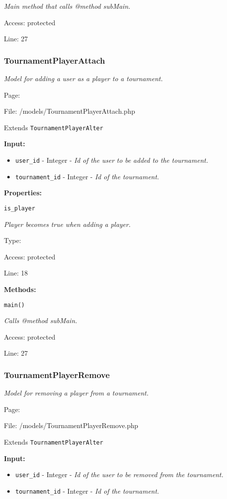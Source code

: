 {\scriptsize
\textit{Main method that calls @method subMain.}

Access: protected

Line: 27

}

\subsubsection{TournamentPlayerAttach}\label{TournamentPlayerAttach.php.doc}
\textit{Model for adding a user as a player to a tournament.}

Page: \pageref{TournamentPlayerAttach.php}

File: /models/TournamentPlayerAttach.php

Extends \texttt{TournamentPlayerAlter}

\textbf{Input:}
\begin{itemize}
\item \texttt{user\_id} - Integer - \textit{Id of the user to be added to the tournament.}
\item \texttt{tournament\_id} - Integer - \textit{Id of the tournament.}
\end{itemize}

\textbf{Properties:}

\texttt{is\_player}

{\scriptsize
\textit{Player becomes true when adding a player.}

Type: 

Access: protected

Line: 18

}
\textbf{Methods:}

\texttt{main()}

{\scriptsize
\textit{Calls @method subMain.}

Access: protected

Line: 27

}

\subsubsection{TournamentPlayerRemove}\label{TournamentPlayerRemove.php.doc}
\textit{Model for removing a player from a tournament.}

Page: \pageref{TournamentPlayerRemove.php}

File: /models/TournamentPlayerRemove.php

Extends \texttt{TournamentPlayerAlter}

\textbf{Input:}
\begin{itemize}
\item \texttt{user\_id} - Integer - \textit{Id of the user to be removed from the tournament.}
\item \texttt{tournament\_id} - Integer - \textit{Id of the tournament.}
\end{itemize}

